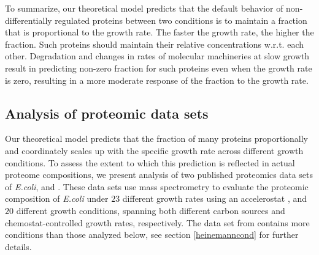\documentclass{article}
\newcommand{\hConds}{$20$}
\newcommand{\vnCondsnum}{23}
\newcommand{\vnConds}{$\vnCondsnum$}
\newcommand{\vConds}{\vnConds{}}
\begin{document}
To summarize, our theoretical model predicts that the default behavior of non-differentially regulated proteins between two conditions is to maintain a fraction that is proportional to the growth rate.
The faster the growth rate, the higher the fraction.
Such proteins should maintain their relative concentrations w.r.t. each other.
Degradation and changes in rates of molecular machineries at slow growth result in predicting non-zero fraction for such proteins even when the growth rate is zero, resulting in a more moderate response of the fraction to the growth rate.

\subsection{Analysis of proteomic data sets}
Our theoretical model predicts that the fraction of many proteins proportionally and coordinately scales up with the specific growth rate across different growth conditions.
To assess the extent to which this prediction is reflected in actual proteome compositions, we present analysis of two published proteomics data sets of \emph{E.coli}, \cite{Peebo_2015} and \cite{Heinemann2015}.
These data sets use mass spectrometry to evaluate the proteomic composition of \emph{E.coli} under \vConds{} different growth rates using an accelerostat \cite{Paalme_1995}, and \hConds{} different growth conditions, spanning both different carbon sources and chemostat-controlled growth rates, respectively.
The data set from \cite{Heinemann2015} contains more conditions than those analyzed below, see section \ref{heinemanncond} for further details.
\end{document}
